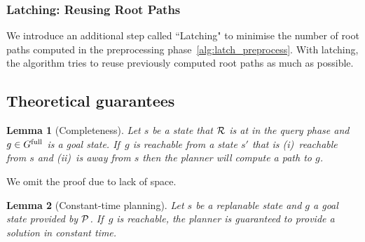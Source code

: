 \documentclass[conference]{IEEEtran}
\newtheorem{lemma}{Lemma}
\begin{document}
%

\subsubsection{Latching: Reusing Root Paths}
\label{latching}
We introduce an additional step called ``Latching" to minimise the number of root paths computed in the preprocessing phase~\ref{alg:latch_preprocess}. With latching, the algorithm tries to reuse previously computed root paths as much as possible.

\subsection{Theoretical guarantees}

\begin{lemma}[Completeness]
\label{lemma:completeness}
Let $s$ be a state that $\mathcal{R}$ is at in the query phase and $g\in G^{\textrm{full}}$ is a goal state.
If~$g$ is reachable from a state $s'$ that is (i)~reachable from $s$ and (ii)~is \Tbound away from $s$ then the planner will compute a path to $g$.
\end{lemma}
We omit the proof due to lack of space.

\begin{lemma}[Constant-time planning]
\label{lemma:bounded_time}
Let $s$ be a replanable state and $g$ a goal state provided by $\mathcal{P}$.
If~$g$ is reachable, the planner is guaranteed to provide a solution in constant time.
\end{lemma}
\end{document}
